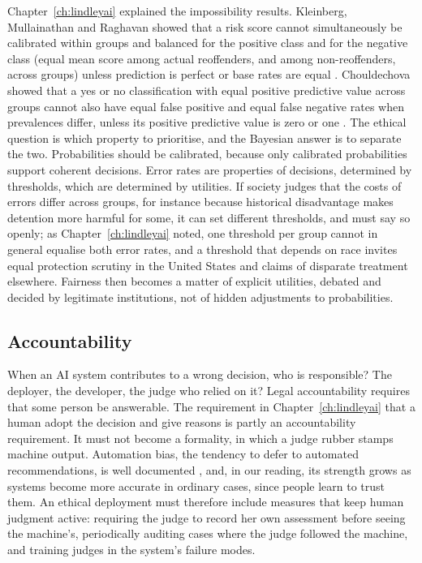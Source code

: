 Chapter~\ref{ch:lindleyai} explained the impossibility results. Kleinberg, Mullainathan and Raghavan showed that a risk score cannot simultaneously be calibrated within groups and balanced for the positive class and for the negative class (equal mean score among actual reoffenders, and among non-reoffenders, across groups) unless prediction is perfect or base rates are equal \citep{kleinberg2017}. Chouldechova showed that a yes or no classification with equal positive predictive value across groups cannot also have equal false positive and equal false negative rates when prevalences differ, unless its positive predictive value is zero or one \citep{chouldechova2017}. The ethical question is which property to prioritise, and the Bayesian answer is to separate the two. Probabilities should be calibrated, because only calibrated probabilities support coherent decisions. Error rates are properties of decisions, determined by thresholds, which are determined by utilities. If society judges that the costs of errors differ across groups, for instance because historical disadvantage makes detention more harmful for some, it can set different thresholds, and must say so openly; as Chapter~\ref{ch:lindleyai} noted, one threshold per group cannot in general equalise both error rates, and a threshold that depends on race invites equal protection scrutiny in the United States and claims of disparate treatment elsewhere. Fairness then becomes a matter of explicit utilities, debated and decided by legitimate institutions, not of hidden adjustments to probabilities.

\subsection{Accountability}

When an AI system contributes to a wrong decision, who is responsible? The deployer, the developer, the judge who relied on it? Legal accountability requires that some person be answerable. The requirement in Chapter~\ref{ch:lindleyai} that a human adopt the decision and give reasons is partly an accountability requirement. It must not become a formality, in which a judge rubber stamps machine output. Automation bias, the tendency to defer to automated recommendations, is well documented \citep{parasuraman2010}, and, in our reading, its strength grows as systems become more accurate in ordinary cases, since people learn to trust them. An ethical deployment must therefore include measures that keep human judgment active: requiring the judge to record her own assessment before seeing the machine's, periodically auditing cases where the judge followed the machine, and training judges in the system's failure modes.

